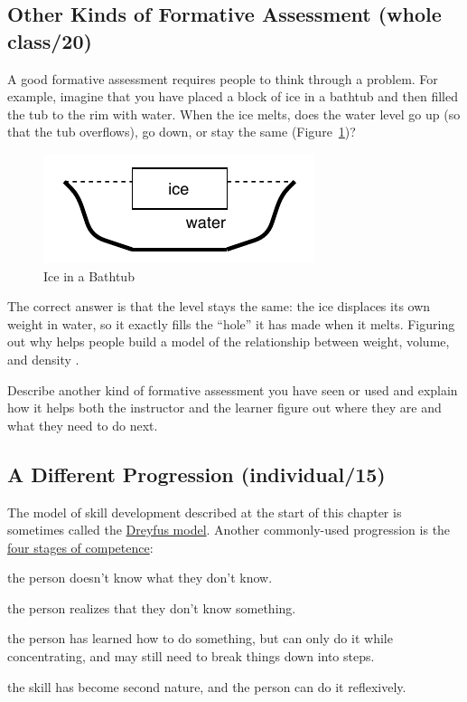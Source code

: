 \subsection{Other Kinds of Formative Assessment (whole class/20)}\label{other-kinds-of-formative-assessment-whole-class20}

A good formative assessment requires people to think through a problem.
For example, imagine that you have placed a block of ice in a bathtub
and then filled the tub to the rim with water. When the ice melts, does
the water level go up (so that the tub overflows), go down, or stay the
same (Figure~\ref{f:models-bathtub})?

\begin{figure}
\centering
\includegraphics{../../figures/bathtub.pdf}
\caption{Ice in a Bathtub}
\label{f:models-bathtub}
\end{figure}

The correct answer is that the level stays the same: the ice displaces
its own weight in water, so it exactly fills the ``hole'' it has made when
it melts. Figuring out why helps people build a model of the
relationship between weight, volume, and density \cite{Epst2002}.

Describe another kind of formative assessment you have seen or used and
explain how it helps both the instructor and the learner figure out
where they are and what they need to do next.

\subsection{A Different Progression (individual/15)}\label{a-different-progression-individual15}

The model of skill development described at the start of this chapter
is sometimes called the \href{https://en.wikipedia.org/wiki/Dreyfus\_model\_of\_skill\_acquisition}{Dreyfus model}. Another
commonly-used progression is the \href{https://en.wikipedia.org/wiki/Four\_stages\_of\_competence}{four stages of
competence}:

\begin{description}
\tightlist
\item[Unconscious incompetence:]
the person doesn't know what they don't know.
\item[Conscious incompetence:]
the person realizes that they don't know something.
\item[Conscious competence:]
the person has learned how to do something, but can only do it while
concentrating, and may still need to break things down into steps.
\item[Unconscious competence:]
the skill has become second nature, and the person can do it
reflexively.
\end{description}

